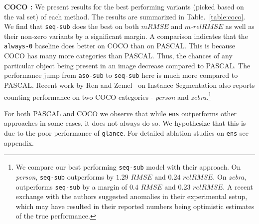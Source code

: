 \documentclass[10pt,twocolumn,letterpaper]{article}
\newcommand{\sub}{\texttt{aso-sub}\xspace}
\newcommand{\seq}{\texttt{seq-sub}\xspace}
\newcommand{\glance}{\texttt{glance}\xspace}
\newcommand{\pascal}{PASCAL\xspace}
\newcommand{\ens}{\texttt{ens}\xspace}
\begin{document}
\textbf{COCO :} We present results for the best performing variants (picked based on the val set) of each method. The results are summarized in Table.~\ref{table:coco}. We find that \seq does the best on both $mRMSE$ and $m$-$relRMSE$ as well as their non-zero variants by a significant margin. A comparison indicates that the \texttt{always-0} baseline does better on COCO than on PASCAL. This is because COCO has many more categories than PASCAL. Thus, the chances of any particular object being present in an image decrease compared to PASCAL. The performance jump from \sub to \seq here is much more compared to \pascal. Recent work by Ren and Zemel~\cite{RenZ16} on Instance Segmentation also reports counting performance on two COCO categories - \textit{person} and \textit{zebra}.\footnote{We compare our best performing \seq model with their approach. On \emph{person}, \seq outperforms by $1.29$ $RMSE$ and $0.24$ $relRMSE$. On \emph{zebra},~\cite{RenZ16} outperforms \seq by a margin of $0.4$ $RMSE$ and $0.23$ $relRMSE$. A recent exchange with the authors suggested anomalies in their experimental setup, which may have resulted in their reported numbers being optimistic estimates of the true performance.}
\par \noindent
For both PASCAL and COCO we observe that while \ens outperforms other approaches in some cases, it does not always do so. We hypothesize that this is due to the poor performance of \glance. For detailed ablation studies on \ens see appendix.
\end{document}
